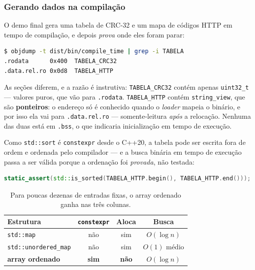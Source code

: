 \subsubsection{Gerando dados na compilação}

O demo final gera uma tabela de CRC-32 e um mapa de códigos HTTP em tempo de
compilação, e depois \emph{prova} onde eles foram parar:

\begin{lstlisting}[style=bt, language=bash,
    caption={Saída de \texttt{src/compile\_time/}: as tabelas no binário.}]
$ objdump -t dist/bin/compile_time | grep -i TABELA
.rodata      0x400  TABELA_CRC32
.data.rel.ro 0x0d8  TABELA_HTTP
\end{lstlisting}

As seções diferem, e a razão é instrutiva: \texttt{TABELA\_CRC32} contém apenas
\texttt{uint32\_t} --- valores puros, que vão para \texttt{.rodata}.
\texttt{TABELA\_HTTP} contém \texttt{string\_view}, que são \textbf{ponteiros}:
o endereço só é conhecido quando o \emph{loader} mapeia o binário, e por isso
ela vai para \texttt{.data.rel.ro} --- somente-leitura \emph{após} a relocação.
Nenhuma das duas está em \texttt{.bss}, o que indicaria inicialização em tempo
de execução.

Como \texttt{std::sort} é \texttt{constexpr} desde o C++20, a tabela pode ser
escrita fora de ordem e ordenada pelo compilador --- e a busca binária em tempo
de execução passa a ser válida porque a ordenação foi \emph{provada}, não
testada:

\begin{lstlisting}[style=bt, language=C++,
    caption={A pré-condição da busca binária, verificada na compilação.}]
static_assert(std::is_sorted(TABELA_HTTP.begin(), TABELA_HTTP.end()));
\end{lstlisting}

\begin{table}[htbp]
\centering
\caption{Para poucas dezenas de entradas fixas, o array ordenado ganha nas três
         colunas.}
\label{tab:mapa-constexpr}
\footnotesize
\begin{tabular}{@{}lccc@{}}
\toprule
\textbf{Estrutura} & \texttt{constexpr} & \textbf{Aloca} & \textbf{Busca} \\
\midrule
\texttt{std::map}            & não & sim & $O(\log n)$ \\
\texttt{std::unordered\_map} & não & sim & $O(1)$ médio \\
\textbf{array ordenado}      & \textbf{sim} & \textbf{não} & $O(\log n)$ \\
\bottomrule
\end{tabular}
\end{table}

